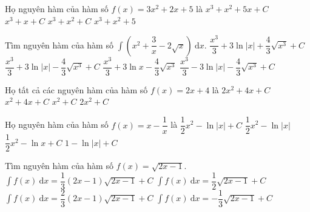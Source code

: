 \begin{ex}%
	Họ  nguyên hàm của hàm số $f(x)=3x^2+2x+5$ là
	\choice 
		{\True  $x^3+x^2+5x+C$}
		{$x^3+x+C$} 
		{$x^3+x^2+C$} 
		 {$x^3+x^2+5$}
\end{ex}

\begin{ex}%
	Tìm nguyên hàm của hàm số $\displaystyle\int\left(x^2+\dfrac{3}{x}-2\sqrt{x}\right)\mathrm{~d}  x$.
	 \choice
		{$\dfrac{x^3}{3}+3\ln|x|+\dfrac{4}{3}  \sqrt{x^3}+C$}
		{\True $\dfrac{x^3}{3}+3\ln|x|-\dfrac{4}{3}  \sqrt{x^3}+C$}
		{$\dfrac{x^3}{3}+3\ln x-\dfrac{4}{3}  \sqrt{x^3}$}
		{$\dfrac{x^3}{3}-3\ln|x|-\dfrac{4}{3} \sqrt{x^3}+C$} 
\end{ex}

\begin{ex}%
	Họ tất cả các nguyên hàm của hàm số $f(x)=2x+4$ là 
	 \choice
		 {$2x^2+4x+C$}
		 {\True $x^2+4x+C$}
		{$x^2+C$} 
		 {$2x^2+C$}
\end{ex}

\begin{ex}%
	Họ nguyên  hàm của hàm số $f(x)=x-\dfrac{1}{x}$ là
	\choice 
		{\True  $\dfrac{1}{2}x^2-\ln\left|x\right|+C$}
		 {$\dfrac{1}{2}x^2-\ln\left|x\right|$}
		 {$\dfrac{1}{2}x^2-\ln x+C$}
		 {$1-\ln\left|x\right|+C$}
\end{ex}

\begin{ex}%
	Tìm nguyên hàm của hàm số $f(x)=\sqrt{2x-1}$. 
	 \choice
		 {\True $\displaystyle\int f(x)\mathrm{~d} x=\dfrac{1}{3}(2x-1) \sqrt{2x-1}+C$}
		{$\displaystyle\int f(x)\mathrm{~d} x=\dfrac{1}{2}  \sqrt{2x-1}+C$}
		 {$\displaystyle\int f(x)\mathrm{~d} x=\dfrac{2}{3}(2x-1) \sqrt{2x-1}+C$}
		{$\displaystyle\int f(x)\mathrm{~d} x=-\dfrac{1}{3} \sqrt{2x-1}+C$} 
\end{ex}

